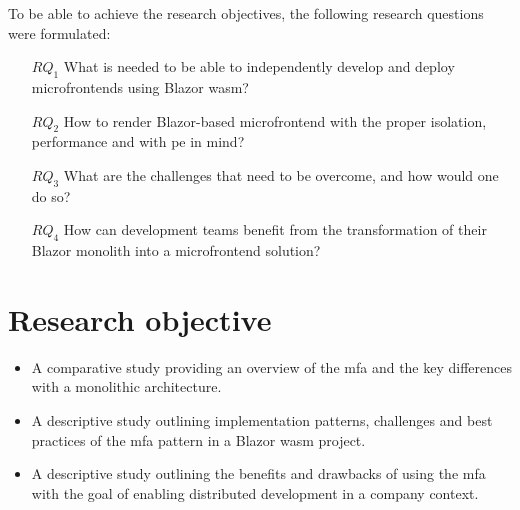
To be able to achieve the research objectives, the following research questions
were formulated:

\begin{itemize}
  \item[$RQ_1$] What is needed to be able to independently develop and deploy
  microfrontends using Blazor \gls{wasm}?
  \item[$RQ_2$] How to render Blazor-based \gls{microfrontend} with the proper
  isolation, performance and with \gls{pe} in mind?
  \item[$RQ_3$] What are the challenges that need to be overcome, and how would
  one do so? 
  \item[$RQ_4$] How can development teams benefit from the transformation of
  their Blazor monolith into a \gls{microfrontend} solution?
\end{itemize}

\section{Research objective}
\label{sec:research-objective}


\begin{itemize}
  \item A comparative study providing an overview of the \gls{mfa} and the key
  differences with a \gls{monolithic} architecture.
  \item A descriptive study outlining implementation patterns, challenges and
  best practices of the \gls{mfa} pattern in a Blazor \gls{wasm} project.
  \item A descriptive study outlining the benefits and drawbacks of using the
  \gls{mfa} with the goal of enabling distributed development in a company
  context.
\end{itemize}

